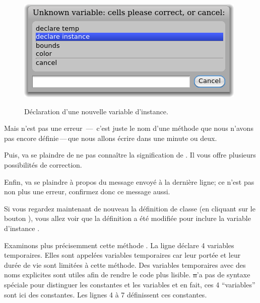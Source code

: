 \documentclass[a4paper,10pt,twoside]{book}
\begin{document}
\begin{figure}[htb]
\begin{minipage}{0.64\textwidth}
		{\includegraphics[scale=0.7]{DeclareInstanceVar}}
	\caption{Déclaration d'une nouvelle variable d'instance.\label{fig:declareInstance}}
\end{minipage}
\end{figure}

Mais  n'est pas une erreur \,---\, c'est juste le nom d'une méthode que nous n'avons pas encore définie\,---\,que nous allons écrire dans une minute ou deux.


Puis, \pharo va se plaindre de ne pas connaître la signification de . Il vous offre plusieurs possibilités de correction.

Enfin, \pharo va se plaindre à propos du message 
envoyé à la dernière ligne; ce n'est pas non plus une erreur,
confirmez donc ce message aussi.

Si vous regardez maintenant de nouveau la définition de classe (en cliquant sur le bouton ), vous allez voir que la définition a été modifiée pour inclure la variable d'instance .

Examinons plus précisemment cette méthode .
La ligne \mbox{} déclare 4 variables temporaires. Elles sont appelées variables temporaires car leur portée et leur durée de vie sont limitées à cette méthode. Des variables temporaires avec des noms explicites sont utiles afin de rendre le code plus lisible. \st n'a pas de syntaxe spéciale pour distinguer les constantes et les variables et en fait, ces 4 ``variables'' sont ici des constantes. Les lignes 4 à 7 définissent ces constantes.
\end{document}
